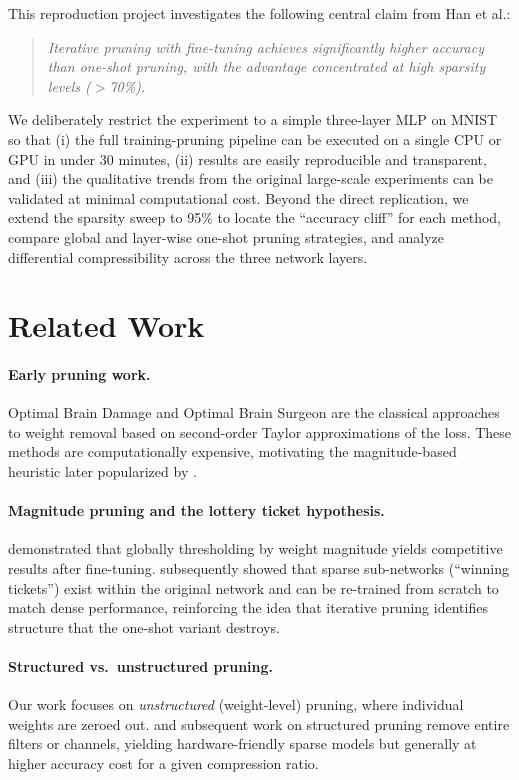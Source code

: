 \documentclass{article}
\begin{document}
This reproduction project investigates the following central claim from Han et al.:

\begin{quote}
  \emph{Iterative pruning with fine-tuning achieves significantly higher accuracy than
  one-shot pruning, with the advantage concentrated at high sparsity levels ($>$70\%).}
\end{quote}

We deliberately restrict the experiment to a simple three-layer MLP on MNIST
so that (i) the full training-pruning pipeline can be executed on a single CPU or GPU
in under 30 minutes, (ii) results are easily reproducible and transparent, and
(iii) the qualitative trends from the original large-scale experiments can be validated
at minimal computational cost.
Beyond the direct replication, we extend the sparsity sweep to 95\% to locate the
``accuracy cliff'' for each method, compare global and layer-wise one-shot pruning strategies,
and analyze differential compressibility across the three network layers.

\section{Related Work}

\paragraph{Early pruning work.}
Optimal Brain Damage \citep{lecun1989optimal} and Optimal Brain Surgeon \citep{hassibi1993second}
are the classical approaches to weight removal based on second-order Taylor approximations
of the loss.
These methods are computationally expensive, motivating the magnitude-based heuristic
later popularized by \citet{han2015learning}.

\paragraph{Magnitude pruning and the lottery ticket hypothesis.}
\citet{han2015learning} demonstrated that globally thresholding by weight magnitude
yields competitive results after fine-tuning.
\citet{frankle2019lottery} subsequently showed that sparse sub-networks (``winning tickets'')
exist within the original network and can be re-trained from scratch to match dense
performance, reinforcing the idea that iterative pruning identifies structure that
the one-shot variant destroys.

\paragraph{Structured vs.\ unstructured pruning.}
Our work focuses on \emph{unstructured} (weight-level) pruning, where individual weights
are zeroed out.
\citet{wen2016learning} and subsequent work on structured pruning remove entire filters
or channels, yielding hardware-friendly sparse models but generally at higher accuracy cost
for a given compression ratio.
\end{document}
